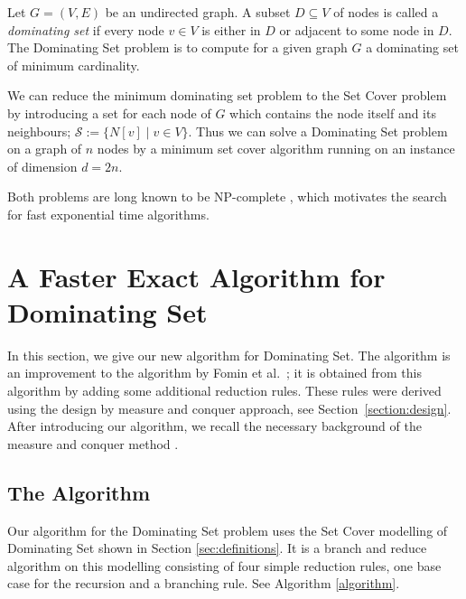 \documentclass[fleqn]{stacs_proc}
\begin{document}
Let $G=(V,E)$ be an undirected graph.
A subset $D \subseteq V$ of nodes is called a \emph{dominating set}
if every node $v \in V$ is either in $D$ or adjacent to some node in $D$.
The {\sc Dominating Set} problem is to compute for a given graph $G$
a dominating set of minimum cardinality.

We can reduce the minimum dominating set problem to the
{\sc Set Cover} problem by introducing a set for each node of $G$ which contains
the node itself and its neighbours; $\mathcal{S} := \{ N[v] \;|\; v \in V \}$.
Thus we can solve a {\sc Dominating Set} problem on a graph of $n$ nodes by a
minimum set cover algorithm running on an instance of dimension $d = 2n$.

Both problems are long known to be NP-complete \cite{GareyJ79,Karp72}, which motivates
the search for fast exponential time algorithms.






\section{A Faster Exact Algorithm for Dominating Set} \label{sec:m&calgorithm}
In this section, we give our new algorithm for {\sc Dominating Set}. The
algorithm is an improvement to the algorithm by Fomin et
al.~\cite{FominGK05a}; it is obtained from this algorithm by adding some
additional reduction rules. These rules were derived using the design by
measure and conquer approach, see Section~\ref{section:design}. After
introducing our algorithm, we recall the necessary background of the measure
and conquer method \cite{FominGK05a}. 




\subsection{The Algorithm}
Our algorithm for the {\sc Dominating Set} problem uses the {\sc Set Cover}
modelling of {\sc Dominating Set} shown in Section \ref{sec:definitions}.
It is a branch and reduce algorithm on this modelling consisting of four simple reduction rules,
one base case for the recursion and a branching rule. See Algorithm \ref{algorithm}.
\end{document}
